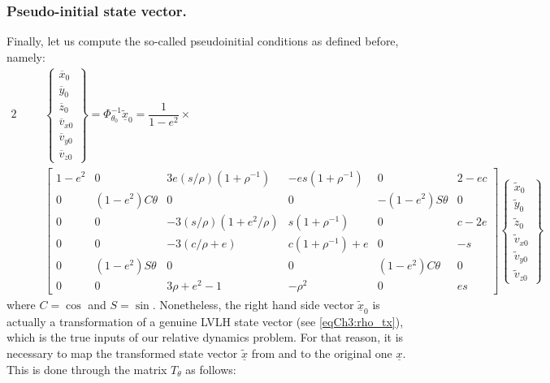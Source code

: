 		\subsubsection{Pseudo-initial state vector.}
		\indent Finally, let us compute the so-called pseudoinitial conditions as defined before, namely:
		\begin{alignat}{2}
		&\nonumber &&\left\{
		\begin{array}{c}
		\overline{x}_0 \\
		\overline{y}_0 \\
		\overline{z}_0 \\
		\overline{v}_{x0} \\
		\overline{v}_{y0} \\
		\overline{v}_{z0} 
		\end{array}
		\right\} =
		\Phi_{\theta_0}^{-1} \widetilde{\underline{x}}_0 = 
		\dfrac{1}{1 - e^2} \times \\
		&\label{eqCh3: Pseudo_ICs}&&\left[
		\begin{array}{cccccc}
		1 - e^2	&    0 					&  3 e  (s/\rho)  (1 + \rho^{-1})		& -e s  (1 + \rho^{-1})	&    0						&                 2 - e c\\
        0		&  (1 - e^2) C\theta	&         0							&                 0		&  -(1 - e^2) S\theta 	&              0\\
        0 		&  	0					&     -3  (s/\rho)  (1 + e^2/\rho)	&   s  (1 + \rho^{-1})	&    0						&              c - 2e	\\
        0		&    0					&          -3  (c/\rho + e)			&  c  (1 + \rho^{-1}) + e	&    0						&      -s 		\\
        0		& (1 - e^2) S\theta 	&                0 					&                 0		&  (1 - e^2) C\theta 	&                              0\\
        0		&	0 					&             3  \rho + e^2 - 1		&           -\rho^2 	&    0						& e s
		\end{array}
		\right]
		\left\{
		\begin{array}{c}
		\widetilde{x}_0 \\
		\widetilde{y}_0 \\
		\widetilde{z}_0 \\
		\widetilde{v}_{x0} \\
		\widetilde{v}_{y0} \\
		\widetilde{v}_{z0} 
		\end{array}
		\right\}
		\end{alignat}
		\noindent where $C = \cos$ and $S = \sin$. Nonetheless, the right hand side vector $\underline{\widetilde{x}}_0$ is actually a transformation of a genuine LVLH state vector (see \eqref{eqCh3:rho_tx}), which is the true inputs of our relative dynamics problem. For that reason, it is necessary to map the transformed state vector $\underline{\widetilde{x}}$ from and to the original one $\underline{x}$. This is done through the matrix $T_{\theta}$ as follows:
